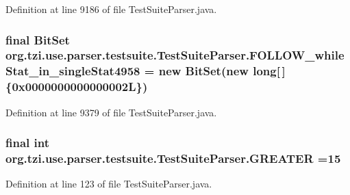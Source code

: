 Definition at line 9186 of file Test\-Suite\-Parser.\-java.

\hypertarget{classorg_1_1tzi_1_1use_1_1parser_1_1testsuite_1_1_test_suite_parser_a446ca5a8b0d84c439f32efb5e096fa99}{
\subsubsection[{F\-O\-L\-L\-O\-W\-\_\-while\-Stat\-\_\-in\-\_\-single\-Stat4958}]{\setlength{\rightskip}{0pt plus 5cm}final Bit\-Set org.\-tzi.\-use.\-parser.\-testsuite.\-Test\-Suite\-Parser.\-F\-O\-L\-L\-O\-W\-\_\-while\-Stat\-\_\-in\-\_\-single\-Stat4958 = new Bit\-Set(new long\mbox{[}$\,$\mbox{]}\{0x0000000000000002\-L\})\hspace{0.3cm}{\ttfamily [static]}}}\label{classorg_1_1tzi_1_1use_1_1parser_1_1testsuite_1_1_test_suite_parser_a446ca5a8b0d84c439f32efb5e096fa99}


Definition at line 9379 of file Test\-Suite\-Parser.\-java.

\hypertarget{classorg_1_1tzi_1_1use_1_1parser_1_1testsuite_1_1_test_suite_parser_aedf1444b83e43a1f5ba52c1a99c052c7}{
\subsubsection[{G\-R\-E\-A\-T\-E\-R}]{\setlength{\rightskip}{0pt plus 5cm}final int org.\-tzi.\-use.\-parser.\-testsuite.\-Test\-Suite\-Parser.\-G\-R\-E\-A\-T\-E\-R =15\hspace{0.3cm}{\ttfamily [static]}}}\label{classorg_1_1tzi_1_1use_1_1parser_1_1testsuite_1_1_test_suite_parser_aedf1444b83e43a1f5ba52c1a99c052c7}


Definition at line 123 of file Test\-Suite\-Parser.\-java.

